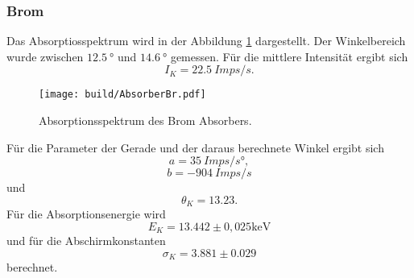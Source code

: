 \subsubsection{Brom}
Das Absorptiosspektrum wird in der Abbildung \ref{fig:AbBr} dargestellt.
Der Winkelbereich wurde zwischen $\qty{12.5}{°}$ und $\qty{14.6}{°}$ gemessen.
Für die mittlere Intensität ergibt sich 
\begin{equation*}
    I_K = \qty{22.5}{Imps/s}.
\end{equation*}

\begin{figure}[H]
    \centering
    \texttt{[image: build/AbsorberBr.pdf]}
    \caption{Absorptionsspektrum des Brom Absorbers.}
    \label{fig:AbBr}
\end{figure}
\noindent Für die Parameter der Gerade und der daraus berechnete Winkel ergibt sich 
\begin{equation*}
    a = \qty{35}{Imps/s°},
\end{equation*}
\begin{equation*}
    b = \qty{-904}{Imps/s}
\end{equation*}
und
\begin{equation*}
    \theta_K = 13.23.
\end{equation*}
Für die Absorptionsenergie wird 
\begin{equation*}
    E_K = 13.442 \pm 0,025 \unit{\kilo\electronvolt}
\end{equation*}
und für die Abschirmkonstanten
\begin{equation*}
     \sigma_K = 3.881 \pm 0.029
\end{equation*}
berechnet.

